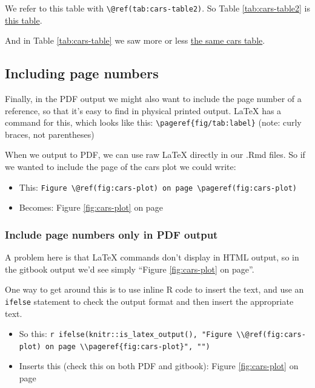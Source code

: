 \documentclass[a4paper, twoside]{templates/ociamthesis}
\providecommand{\tightlist}{%
  \setlength{\itemsep}{0pt}\setlength{\parskip}{0pt}}
\begin{document}
We refer to this table with \texttt{\textbackslash{}@ref(tab:cars-table2)}.
So Table \ref{tab:cars-table2} is \protect\hyperlink{tab:cars-table2}{this table}.

And in Table \ref{tab:cars-table} we saw more or less \protect\hyperlink{tab:cars-table}{the same cars table}.

\hypertarget{including-page-numbers}{%
\subsection{Including page numbers}\label{including-page-numbers}}

Finally, in the PDF output we might also want to include the page number of a reference, so that it's easy to find in physical printed output.
LaTeX has a command for this, which looks like this: \texttt{\textbackslash{}pageref\{fig/tab:label\}} (note: curly braces, not parentheses)

When we output to PDF, we can use raw LaTeX directly in our .Rmd files. So if we wanted to include the page of the cars plot we could write:

\begin{itemize}
\tightlist
\item
  This: \texttt{Figure\ \textbackslash{}@ref(fig:cars-plot)\ on\ page\ \textbackslash{}pageref(fig:cars-plot)}
\item
  Becomes: Figure \ref{fig:cars-plot} on page \pageref{fig:cars-plot}
\end{itemize}

\hypertarget{include-page-numbers-only-in-pdf-output}{%
\subsubsection{Include page numbers only in PDF output}\label{include-page-numbers-only-in-pdf-output}}

A problem here is that LaTeX commands don't display in HTML output, so in the gitbook output we'd see simply ``Figure \ref{fig:cars-plot} on page''.

One way to get around this is to use inline R code to insert the text, and use an \texttt{ifelse} statement to check the output format and then insert the appropriate text.

\begin{itemize}
\tightlist
\item
  So this: \texttt{\textasciigrave{}r\ ifelse(knitr::is\_latex\_output(),\ "Figure\ \textbackslash{}\textbackslash{}@ref(fig:cars-plot)\ on\ page\ \textbackslash{}\textbackslash{}pageref\{fig:cars-plot\}",\ "")\textasciigrave{}}
\item
  Inserts this (check this on both PDF and gitbook): Figure \ref{fig:cars-plot} on page \pageref{fig:cars-plot}
\end{itemize}
\end{document}
